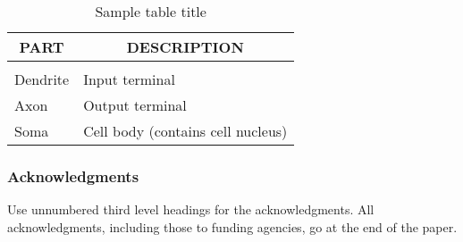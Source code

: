 \documentclass{article} %
\begin{document}
\begin{table}[t]
\caption{Sample table title}
\label{sample-table}
\begin{center}
\begin{tabular}{ll}
\multicolumn{1}{c}{\bf PART}  &\multicolumn{1}{c}{\bf DESCRIPTION}
\\ \hline \\
Dendrite         &Input terminal \\
Axon             &Output terminal \\
Soma             &Cell body (contains cell nucleus) \\
\end{tabular}
\end{center}
\end{table}





\subsubsection*{Acknowledgments}
Use unnumbered third level headings for the acknowledgments. All
acknowledgments, including those to funding agencies, go at the end of the paper.




\end{document}
